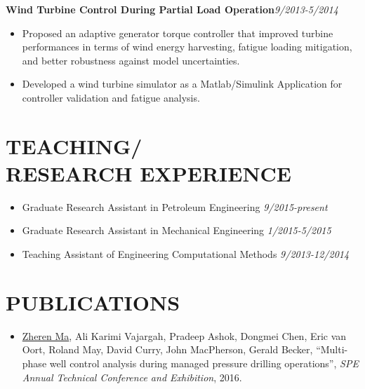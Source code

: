\documentclass[margin, 9pt]{res} %
\begin{document}
\begin{resume}
\medskip
{\textbf{Wind Turbine Control During Partial Load Operation}}\hfill\textit{9/2013-5/2014}\\
\vspace*{-10pt}
\begin{itemize}[leftmargin=*] \itemsep -3pt
\vspace*{-5pt}
	\item Proposed an adaptive generator torque controller that  improved turbine performances in terms of wind energy harvesting, fatigue loading mitigation, and better robustness against model uncertainties.
    \item Developed a wind turbine simulator as a Matlab/Simulink Application  for controller validation and fatigue analysis.
\end{itemize}


\section{TEACHING/\\RESEARCH EXPERIENCE}
\begin{itemize}[leftmargin=*] \itemsep -2pt
\vspace*{-2pt}
	\item Graduate Research Assistant in Petroleum Engineering \hfill\textit{9/2015-present}
	\item Graduate Research Assistant in Mechanical Engineering \hfill\textit{1/2015-5/2015}
	\item Teaching Assistant of Engineering Computational Methods \hfill\textit{9/2013-12/2014}
\end{itemize}


\section{PUBLICATIONS}
\begin{itemize}[leftmargin=*] \itemsep 0pt
\vspace*{-1pt}
    \item \underline{Zheren Ma}, Ali Karimi Vajargah, Pradeep Ashok, Dongmei Chen, Eric van Oort, Roland May, David Curry, John MacPherson, Gerald Becker,
        {``Multi-phase well control analysis during managed pressure drilling operations''},
       \textit{SPE Annual Technical Conference and Exhibition}, 2016.


\end{itemize}
\end{resume}
\end{document}
